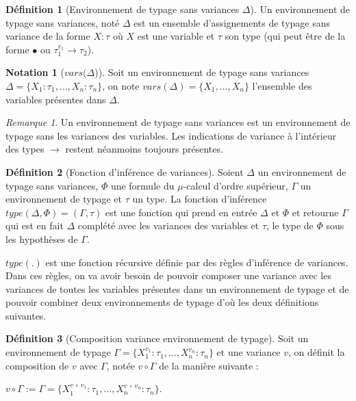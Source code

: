 \documentclass{rapport}
\theoremstyle{plain}
\theoremstyle{remark}
\newtheorem{rema}{Remarque}
\theoremstyle{definition}
\newtheorem{notat}{Notation}
\newtheorem{dfn}{Définition}
\begin{document}
\begin{dfn} [Environnement de typage sans variances $\Delta$] Un environnement de typage sans variances, noté $\Delta$ est un ensemble d'assignements de typage sans variance de la forme ${X : \tau}$ où $X$ est une variable et $\tau$ son type (qui peut être de la forme $\bullet$ ou ${\tau_1^{v_1} \rightarrow \tau_2}$).  
\end{dfn}

\begin{notat} [$vars(\Delta$)] Soit un environnement de typage sans variances ${\Delta = \{X_1 : \tau_1, \ldots, X_n : \tau_n\}}$, on note ${vars(\Delta) = \{X_1, \ldots, X_n\}}$ l'ensemble des variables présentes dans $\Delta$.
\end{notat}

\begin{rema}
Un environnement de typage sans variances est un environnement de typage sans les variances des variables. Les indications de variance à l'intérieur des types $\rightarrow$ restent néanmoins toujours présentes. 
\end{rema}

\begin{dfn} [Fonction d'inférence de variances] Soient $\Delta$ un environnement de typage sans variances, $\Phi$ une formule du $\mu$-calcul d'ordre supérieur, $\Gamma$ un environnement de typage et $\tau$ un type. La fonction d'inférence $type(\Delta, \Phi) = (\Gamma, \tau)$ est une fonction qui prend en entrée $\Delta$ et $\Phi$ et retourne $\Gamma$ qui est en fait $\Delta$ complété avec les variances des variables et $\tau$, le type de $\Phi$ sous les hypothèses de $\Gamma$. 
\end{dfn}

$type(.)$ est une fonction récursive définie par des règles d'inférence de variances. Dans ces règles, on va avoir besoin de pouvoir composer une variance avec les variances de toutes les variables présentes dans un environnement de typage et de pouvoir combiner deux environnements de typage d'où les deux définitions suivantes.

\begin{dfn} [Composition variance environnement de typage] Soit un environnement de typage ${\Gamma = \{X_1^{v_1} : \tau_1, \ldots, X_n^{v_n} : \tau_n\}}$ et une variance $v$, on définit la composition de $v$ avec $\Gamma$, notée ${v \circ \Gamma}$ de la manière suivante : 
\begin{center}
${v \circ \Gamma} := {\Gamma = \{X_1^{v \, \circ \, v_1} : \tau_1, \ldots, X_n^{v \, \circ \, v_n} : \tau_n\}}$.
\end{center}
\end{dfn}
\end{document}
